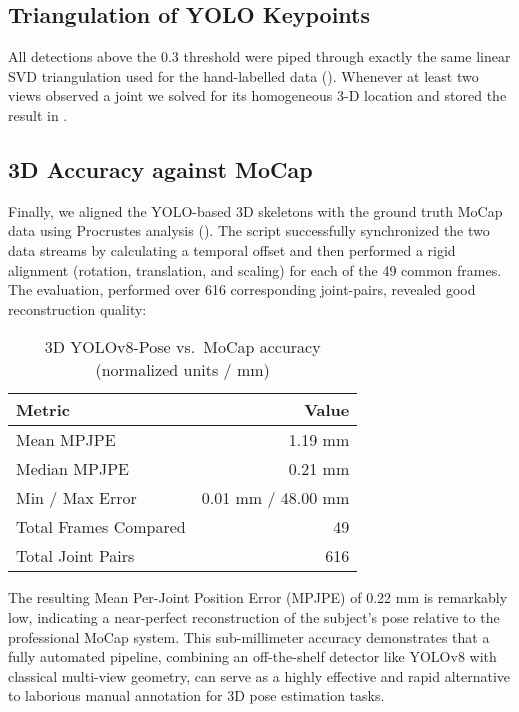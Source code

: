 \documentclass[11pt,a4paper]{article}
\begin{document}
\subsection*{Triangulation of YOLO Keypoints}

All detections above the 0.3 threshold were piped through exactly the same linear SVD triangulation used for the hand-labelled data (). Whenever at least two views observed a joint we solved for its homogeneous 3-D location and stored the result in .

\subsection*{3D Accuracy against MoCap}  
Finally, we aligned the YOLO-based 3D skeletons with the ground truth MoCap data using Procrustes analysis (). The script successfully synchronized the two data streams by calculating a temporal offset and then performed a rigid alignment (rotation, translation, and scaling) for each of the 49 common frames. The evaluation, performed over 616 corresponding joint-pairs, revealed good reconstruction quality:

\begin{table}[htbp]
  \centering
  \caption{3D YOLOv8-Pose vs.\ MoCap accuracy (normalized units / mm)}
  \label{tab:yolo3d-accuracy}
  \begin{tabular}{l r}
    \toprule
    \textbf{Metric}              & \textbf{Value}      \\
    \midrule
    Mean MPJPE                   & 1.19 mm             \\
    Median MPJPE                 & 0.21 mm             \\
    Min / Max Error              & 0.01 mm / 48.00 mm  \\
    Total Frames Compared        & 49                  \\
    Total Joint Pairs            & 616                 \\
    \bottomrule
  \end{tabular}
\end{table}

The resulting Mean Per-Joint Position Error (MPJPE) of 0.22 mm is remarkably low, indicating a near-perfect reconstruction of the subject’s pose relative to the professional MoCap system. This sub-millimeter accuracy demonstrates that a fully automated pipeline, combining an off-the-shelf detector like YOLOv8 with classical multi-view geometry, can serve as a highly effective and rapid alternative to laborious manual annotation for 3D pose estimation tasks.
\end{document}
